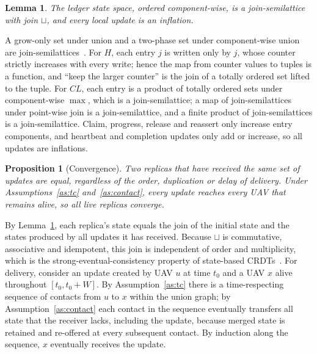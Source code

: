 \documentclass[journal]{IEEEtran}
\newtheorem{proposition}{Proposition}
\newtheorem{lemma}{Lemma}
\begin{document}
\begin{lemma}\label{lem:lattice}
The ledger state space, ordered component-wise, is a join-semilattice with join $\sqcup$, and every local update is an inflation.
\end{lemma}
\begin{IEEEproof}
A grow-only set under union and a two-phase set under component-wise union are join-semilattices~\cite{R10_shapiro2011}. For $H$, each entry $j$ is written only by $j$, whose counter strictly increases with every write; hence the map from counter values to tuples is a function, and ``keep the larger counter'' is the join of a totally ordered set lifted to the tuple. For $\mathit{CL}$, each entry is a product of totally ordered sets under component-wise $\max$, which is a join-semilattice; a map of join-semilattices under point-wise join is a join-semilattice, and a finite product of join-semilattices is a join-semilattice. Claim, progress, release and reassert only increase entry components, and heartbeat and completion updates only add or increase, so all updates are inflations.
\end{IEEEproof}

\begin{proposition}[Convergence]\label{prop:sec}
Two replicas that have received the same set of updates are equal, regardless of the order, duplication or delay of delivery. Under Assumptions~\ref{as:tc} and~\ref{as:contact}, every update reaches every UAV that remains alive, so all live replicas converge.
\end{proposition}
\begin{IEEEproof}
By Lemma~\ref{lem:lattice}, each replica's state equals the join of the initial state and the states produced by all updates it has received. Because $\sqcup$ is commutative, associative and idempotent, this join is independent of order and multiplicity, which is the strong-eventual-consistency property of state-based CRDTs~\cite{R10_shapiro2011}. For delivery, consider an update created by UAV $u$ at time $t_0$ and a UAV $x$ alive throughout $[t_0,t_0+W]$. By Assumption~\ref{as:tc} there is a time-respecting sequence of contacts from $u$ to $x$ within the union graph; by Assumption~\ref{as:contact} each contact in the sequence eventually transfers all state that the receiver lacks, including the update, because merged state is retained and re-offered at every subsequent contact. By induction along the sequence, $x$ eventually receives the update.
\end{IEEEproof}
\end{document}
